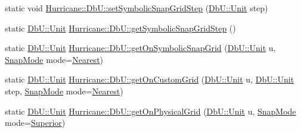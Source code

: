 \begin{DoxyCompactItemize}
\item 
static void \mbox{\hyperlink{group__DbUGroup_ga9ccd423c8f268ef54770f4663e6c9304}{Hurricane\+::\+Db\+U\+::set\+Symbolic\+Snap\+Grid\+Step}} (\mbox{\hyperlink{group__DbUGroup_ga4fbfa3e8c89347af76c9628ea06c4146}{Db\+U\+::\+Unit}} step)
\item 
static \mbox{\hyperlink{group__DbUGroup_ga4fbfa3e8c89347af76c9628ea06c4146}{Db\+U\+::\+Unit}} \mbox{\hyperlink{group__DbUGroup_ga687a9134729b107c42fb7f69596c4c3b}{Hurricane\+::\+Db\+U\+::get\+Symbolic\+Snap\+Grid\+Step}} ()
\item 
static \mbox{\hyperlink{group__DbUGroup_ga4fbfa3e8c89347af76c9628ea06c4146}{Db\+U\+::\+Unit}} \mbox{\hyperlink{group__DbUGroup_gad1b0c0f3680093cf5a63d901312c925d}{Hurricane\+::\+Db\+U\+::get\+On\+Symbolic\+Snap\+Grid}} (\mbox{\hyperlink{group__DbUGroup_ga4fbfa3e8c89347af76c9628ea06c4146}{Db\+U\+::\+Unit}} u, \mbox{\hyperlink{group__DbUGroup_ga1082168d6f9956ebba22ab8bbec21637}{Snap\+Mode}} mode=\mbox{\hyperlink{group__DbUGroup_gga1082168d6f9956ebba22ab8bbec21637a65e6f47eb16779b8974a80d6145a2db5}{Nearest}})
\item 
static \mbox{\hyperlink{group__DbUGroup_ga4fbfa3e8c89347af76c9628ea06c4146}{Db\+U\+::\+Unit}} \mbox{\hyperlink{group__DbUGroup_ga87323d9038656dceabffc37d45de408a}{Hurricane\+::\+Db\+U\+::get\+On\+Custom\+Grid}} (\mbox{\hyperlink{group__DbUGroup_ga4fbfa3e8c89347af76c9628ea06c4146}{Db\+U\+::\+Unit}} u, \mbox{\hyperlink{group__DbUGroup_ga4fbfa3e8c89347af76c9628ea06c4146}{Db\+U\+::\+Unit}} step, \mbox{\hyperlink{group__DbUGroup_ga1082168d6f9956ebba22ab8bbec21637}{Snap\+Mode}} mode=\mbox{\hyperlink{group__DbUGroup_gga1082168d6f9956ebba22ab8bbec21637a65e6f47eb16779b8974a80d6145a2db5}{Nearest}})
\item 
static \mbox{\hyperlink{group__DbUGroup_ga4fbfa3e8c89347af76c9628ea06c4146}{Db\+U\+::\+Unit}} \mbox{\hyperlink{group__DbUGroup_ga9419025221579f4277475c65655be3dc}{Hurricane\+::\+Db\+U\+::get\+On\+Physical\+Grid}} (\mbox{\hyperlink{group__DbUGroup_ga4fbfa3e8c89347af76c9628ea06c4146}{Db\+U\+::\+Unit}} u, \mbox{\hyperlink{group__DbUGroup_ga1082168d6f9956ebba22ab8bbec21637}{Snap\+Mode}} mode=\mbox{\hyperlink{group__DbUGroup_gga1082168d6f9956ebba22ab8bbec21637a8ce92cf7ff7627c46baf85612f9ad847}{Superior}})
\end{DoxyCompactItemize}
